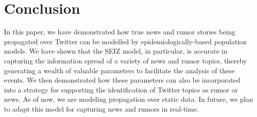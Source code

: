 \section{Conclusion}
In this paper, we have demonstrated how true news and rumor stories being propagated over Twitter can be modelled by epidemiologically-based population models. We have shown that the SEIZ model, in particular, is accurate in capturing the information spread of a variety of news and rumor topics, thereby generating a wealth of valuable parameters to facilitate the analysis of these events. We then demonstrated how these parameters can also be incorporated into a strategy for supporting the identification of Twitter topics as rumor or news. As of now, we are modeling propagation over static data. In future, we plan to adapt this model for capturing news and rumors in real-time.




